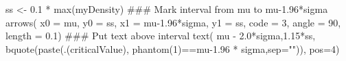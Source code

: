 \begin{Schunk}
\begin{Sinput}
 ss <- 0.1 * max(myDensity)
 ### Mark interval from mu to mu-1.96*sigma
 arrows( x0 = mu, y0 = ss, x1 = mu-1.96*sigma, y1 = ss, code = 3, angle = 90, length = 0.1)
 ### Put text above interval
 text( mu - 2.0*sigma,1.15*ss, bquote(paste(.(criticalValue), phantom(1)==mu-1.96 * sigma,sep="")), pos=4)
\end{Sinput}
\end{Schunk}
